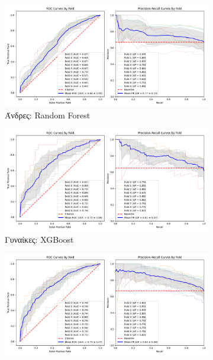 \documentclass[12pt]{report}
\begin{document}
\begin{figure}[ht]
\begin{subfigure}[b]{0.48\textwidth}
                        \includegraphics[width=\textwidth]{ML/CV/stratified_Male_50-70_RF_useSMOTE_False_k_fold_validation.png}
                        \caption{Άνδρες: Random Forest}
                        \label{stratified_Male_50-70_RF_useSMOTE_False_k_fold_validation}
                    \end{subfigure}
                    \vspace{0.5cm}
                    \begin{subfigure}[b]{0.48\textwidth}
                        \includegraphics[width=\textwidth]{ML/CV/stratified_Female_50-70_XGBOOST_useSMOTE_False_k_fold_validation.png}
                        \caption{Γυναίκες: XGBoost}
                        \label{stratified_Female_50-70_XGBOOST_useSMOTE_False_k_fold_validation}
                    \end{subfigure}
                    \hfill
                    \begin{subfigure}[b]{0.48\textwidth}
                        \includegraphics[width=\textwidth]{ML/CV/stratified_Male_50-70_XGBOOST_useSMOTE_False_k_fold_validation.png}

\end{subfigure}
\end{figure}
\end{document}
